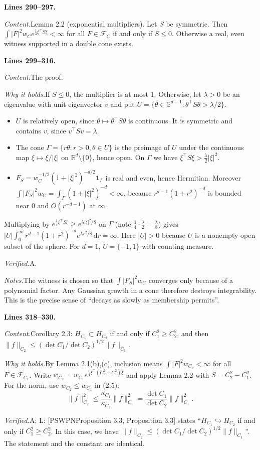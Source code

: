 \documentclass[11pt]{amsart}
\newcommand{\R}{\mathbb{R}}
\newcommand{\Sph}{\mathbb{S}}
\newcommand{\dd}{\,\mathrm{d}}
\newcommand{\FC}[1]{\mathcal{F}_{#1}}
\newcommand{\tp}{\top}
\newcommand{\src}[1]{\par\bigskip\noindent\textbf{Lines #1.}\enspace}
\newcommand{\content}{\par\smallskip\noindent\textit{Content.}\enspace}
\newcommand{\why}{\par\smallskip\noindent\textit{Why it holds.}\enspace}
\newcommand{\verified}{\par\smallskip\noindent\textit{Verified.}\enspace}
\newcommand{\notes}{\par\smallskip\noindent\textit{Notes.}\enspace}
\newcommand{\tA}{\textsf{A}}
\newcommand{\tL}{\textsf{L}}
\newcommand{\PS}[1][]{[PSWPN\ifx\relax#1\relax\else, #1\fi]}
\begin{document}
\src{290--297}
\content Lemma 2.2 (exponential multipliers). Let $S$ be symmetric. Then $\int|F|^2w_Ce^{\frac14\xi^\tp S\xi}<\infty$
for all $F\in\FC{C}$ if and only if $S\le0$. Otherwise a real, even witness supported in a double cone exists.

\src{299--316}
\content The proof.
\why If $S\le0$, the multiplier is at most $1$. Otherwise, let $\lambda>0$ be an eigenvalue with unit eigenvector $v$
and put $U=\{\theta\in\Sph^{d-1}:\theta^\tp S\theta>\lambda/2\}$.
\begin{itemize}
\item $U$ is relatively open, since $\theta\mapsto\theta^\tp S\theta$ is continuous. It is symmetric and contains
$v$, since $v^\tp Sv=\lambda$.
\item The cone $\Gamma=\{r\theta:r>0,\theta\in U\}$ is the preimage of $U$ under the continuous map
$\xi\mapsto\xi/|\xi|$ on $\R^d\setminus\{0\}$, hence open. On $\Gamma$ we have $\xi^\tp S\xi>\frac\lambda2|\xi|^2$.
\item $F_S=w_C^{-1/2}(1+|\xi|^2)^{-d/2}\mathbf 1_\Gamma$ is real and even, hence Hermitian. Moreover
$\int|F_S|^2w_C=\int_\Gamma(1+|\xi|^2)^{-d}<\infty$, because $r^{d-1}(1+r^2)^{-d}$ is bounded near $0$ and
$O(r^{-d-1})$ at $\infty$.
\end{itemize}
Multiplying by $e^{\frac14\xi^\tp S\xi}\ge e^{\lambda|\xi|^2/8}$ on $\Gamma$ (note $\frac14\cdot\frac\lambda2=\frac\lambda8$)
gives $|U|\int_0^\infty r^{d-1}(1+r^2)^{-d}e^{\lambda r^2/8}\dd r=\infty$. Here $|U|>0$ because $U$ is a nonempty open
subset of the sphere. For $d=1$, $U=\{-1,1\}$ with counting measure.
\verified \tA.
\notes The witness is chosen so that $\int|F_S|^2w_C$ converges only because of a polynomial factor. Any Gaussian
growth in a cone therefore destroys integrability. This is the precise sense of ``decays as slowly as membership
permits''.

\src{318--330}
\content Corollary 2.3: $H_{C_1}\subset H_{C_2}$ if and only if $C_1^2\ge C_2^2$, and then
$\|f\|_{C_2}\le(\det C_1/\det C_2)^{1/2}\|f\|_{C_1}$.
\why By Lemma 2.1(b),(c), inclusion means $\int|F|^2w_{C_2}<\infty$ for all $F\in\FC{C_1}$. Write
$w_{C_2}=w_{C_1}e^{\frac14\xi^\tp(C_2^2-C_1^2)\xi}$ and apply Lemma 2.2 with $S=C_2^2-C_1^2$. For the norm, use
$w_{C_2}\le w_{C_1}$ in (2.5):
\[
\|f\|_{C_2}^2\le\frac{\kappa_{C_1}}{\kappa_{C_2}}\|f\|_{C_1}^2=\frac{\det C_1}{\det C_2}\|f\|_{C_1}^2 .
\]
\verified \tA; \tL: \PS[Proposition 3.3] states ``$H_{C_1}\hookrightarrow H_{C_2}$ if and only if $C_1^2\ge C_2^2$. In
this case, we have $\|f\|_{C_2}\le(\det C_1/\det C_2)^{1/2}\|f\|_{C_1}$''. The statement and the constant are
identical.
\end{document}
